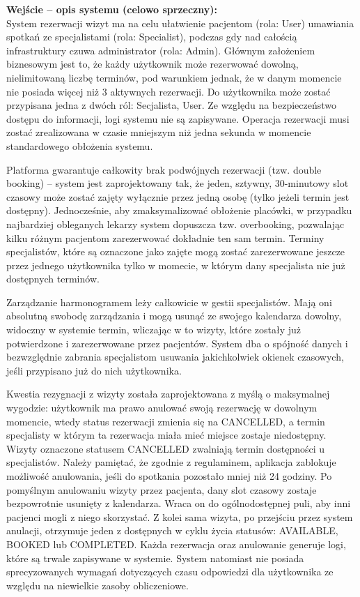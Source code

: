 \documentclass[12pt,a4paper]{article}
\begin{document}
\vspace{0.5em}
\begin{mdframed}[backgroundcolor=metabg, linewidth=0pt, innerleftmargin=10pt, innerrightmargin=10pt, innertopmargin=8pt, innerbottommargin=8pt]
\textbf{Wejście -- opis systemu (celowo sprzeczny):}\\[0.3em]
\small
System rezerwacji wizyt ma na celu ułatwienie pacjentom (rola: User) umawiania spotkań ze specjalistami (rola: Specialist), podczas gdy nad całością infrastruktury czuwa administrator (rola: Admin). Głównym założeniem biznesowym jest to, że każdy użytkownik może rezerwować dowolną, nielimitowaną liczbę terminów, pod warunkiem jednak, że w danym momencie nie posiada więcej niż 3 aktywnych rezerwacji. Do użytkownika może zostać przypisana jedna z dwóch ról: Secjalista, User.
Ze względu na bezpieczeństwo dostępu do informacji, logi systemu nie są zapisywane. Operacja rezerwacji musi zostać zrealizowana w czasie mniejszym niż jedna sekunda w momencie standardowego obłożenia systemu.

Platforma gwarantuje całkowity brak podwójnych rezerwacji (tzw. double booking) – system jest zaprojektowany tak, że jeden, sztywny, 30-minutowy slot czasowy może zostać zajęty wyłącznie przez jedną osobę (tylko jeżeli termin jest dostępny). Jednocześnie, aby zmaksymalizować obłożenie placówki, w przypadku najbardziej obleganych lekarzy system dopuszcza tzw. overbooking, pozwalając kilku różnym pacjentom zarezerwować dokładnie ten sam termin. Terminy specjalistów, które są oznaczone jako zajęte mogą zostać zarezerwowane jeszcze przez jednego użytkownika tylko w momecie, w którym dany specjalista nie już dostępnych terminów.

Zarządzanie harmonogramem leży całkowicie w gestii specjalistów. Mają oni absolutną swobodę zarządzania i mogą usunąć ze swojego kalendarza dowolny, widoczny w systemie termin, wliczając w to wizyty, które zostały już potwierdzone i zarezerwowane przez pacjentów. System dba o spójność danych i bezwzględnie zabrania specjalistom usuwania jakichkolwiek okienek czasowych, jeśli przypisano już do nich użytkownika.

Kwestia rezygnacji z wizyty została zaprojektowana z myślą o maksymalnej wygodzie: użytkownik ma prawo anulować swoją rezerwację w dowolnym momencie, wtedy status rezerwacji zmienia się na CANCELLED, a termin specjalisty w którym ta rezerwacja miała mieć miejsce zostaje niedostępny. Wizyty oznaczone statusem CANCELLED zwalniają termin dostępności u specjalistów. Należy pamiętać, że zgodnie z regulaminem, aplikacja zablokuje możliwość anulowania, jeśli do spotkania pozostało mniej niż 24 godziny. Po pomyślnym anulowaniu wizyty przez pacjenta, dany slot czasowy zostaje bezpowrotnie usunięty z kalendarza. Wraca on do ogólnodostępnej puli, aby inni pacjenci mogli z niego skorzystać. Z kolei sama wizyta, po przejściu przez system anulacji, otrzymuje jeden z dostępnych w cyklu życia statusów: AVAILABLE, BOOKED lub COMPLETED. Każda rezerwacja oraz anulowanie generuje logi, które są trwale zapisywane w systemie. System natomiast nie posiada sprecyzowanych wymagań dotyczących czasu odpowiedzi dla użytkownika ze względu na niewielkie zasoby obliczeniowe.


\end{mdframed}
\end{document}
